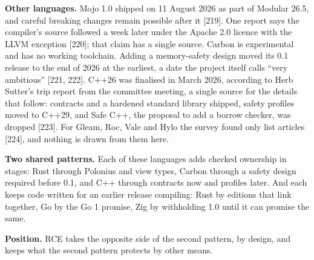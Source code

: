 \documentclass[10pt,letterpaper]{article}
\begin{document}
\textbf{Other languages.} Mojo 1.0 shipped on 11 August 2026 as part of
Modular 26.5, and careful breaking changes remain possible after it
{[}219{]}. One report says the compiler's source followed a week later
under the Apache 2.0 licence with the LLVM exception {[}220{]}; that
claim has a single source. Carbon is experimental and has no working
toolchain. Adding a memory-safety design moved its 0.1 release to the
end of 2026 at the earliest, a date the project itself calls ``very
ambitious'' {[}221, 222{]}. C++26 was finalised in March 2026, according
to Herb Sutter's trip report from the committee meeting, a single source
for the details that follow: contracts and a hardened standard library
shipped, safety profiles moved to C++29, and Safe C++, the proposal to
add a borrow checker, was dropped {[}223{]}. For Gleam, Roc, Vale and
Hylo the survey found only list articles {[}224{]}, and nothing is drawn
from them here.

\textbf{Two shared patterns.} Each of these languages adds checked
ownership in stages: Rust through Polonius and view types, Carbon
through a safety design required before 0.1, and C++ through contracts
now and profiles later. And each keeps code written for an earlier
release compiling: Rust by editions that link together, Go by the Go 1
promise, Zig by withholding 1.0 until it can promise the same.

\textbf{Position.} RCE takes the opposite side of the second pattern, by
design, and keeps what the second pattern protects by other means.
\end{document}
